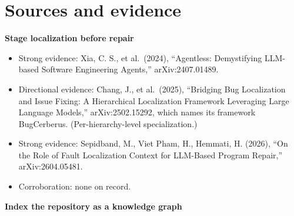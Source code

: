 \section*{Sources and evidence}

\textbf{Stage localization before repair}

\begin{itemize}
\tightlist
\item
  Strong evidence: Xia, C. S., et al.~(2024), ``Agentless: Demystifying LLM-based Software Engineering Agents,'' arXiv:2407.01489.
\item
  Directional evidence: Chang, J., et al.~(2025), ``Bridging Bug Localization and Issue Fixing: A Hierarchical Localization Framework Leveraging Large Language Models,'' arXiv:2502.15292, which names its framework BugCerberus. (Per-hierarchy-level specialization.)
\item
  Strong evidence: Sepidband, M., Viet Pham, H., Hemmati, H. (2026), ``On the Role of Fault Localization Context for LLM-Based Program Repair,'' arXiv:2604.05481.
\item
  Corroboration: none on record.
\end{itemize}

\textbf{Index the repository as a knowledge graph}


